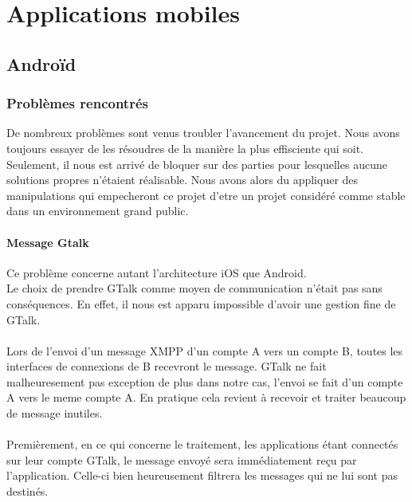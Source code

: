 \section{Applications mobiles}


\subsection{Androïd}

\subsubsection{Problèmes rencontrés}

De nombreux problèmes sont venus troubler l'avancement du projet. Nous avons toujours essayer de les
résoudres de la manière la plus effisciente qui soit. Seulement, il nous est arrivé de bloquer sur des
parties pour lesquelles aucune solutions propres n'étaient réalisable. Nous avons alors du appliquer 
des manipulations qui empecheront ce projet d'etre un projet considéré comme stable dans un environnement
grand public.

\paragraph{Message Gtalk}

Ce problème concerne autant l'architecture iOS que Android. 
\\
Le choix de prendre GTalk comme moyen de communication n'était pas sans conséquences. En effet, il nous
est apparu impossible d'avoir une gestion fine de GTalk.
\\\\
Lors de l'envoi d'un message XMPP d'un compte A vers un compte B, toutes les interfaces de connexions
de B recevront le message. GTalk ne fait malheuresement pas exception de plus dans notre cas, l'envoi
se fait d'un compte A vers le meme compte A. En pratique cela revient à recevoir et traiter beaucoup de
message inutiles.
\\\\
Premièrement, en ce qui concerne le traitement, les applications étant connectés sur leur compte GTalk, 
le message envoyé sera immédiatement reçu par l'application. Celle-ci bien heureusement filtrera les 
messages qui ne lui sont pas destinés. 

